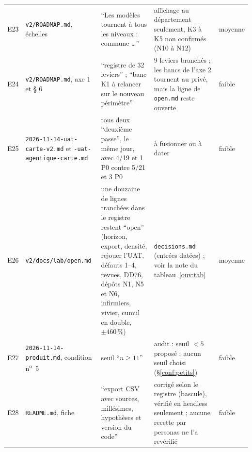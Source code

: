 \begin{small}
\begin{longtable}{@{}p{}p{}p{}p{}p{}@{}}
E23 & \texttt{v2/\allowbreak{}ROADMAP.md}, échelles & \enquote{Les modèles tournent à tous les niveaux : commune \ldots} & affichage au département seulement, K3 à K5 non confirmés (N10 à N12) & moyenne \\
E24 & \texttt{v2/\allowbreak{}ROADMAP.md}, axe 1 et § 6 & \enquote{registre de 32 leviers} ; \enquote{banc K1 à relancer sur le nouveau périmètre} & 9\mesure{} leviers branchés ; les bancs de l'axe 2 tournent au privé, mais la ligne de \texttt{open.md} reste ouverte & faible \\
E25 & \texttt{2026-\allowbreak{}11-\allowbreak{}14-\allowbreak{}uat-\allowbreak{}carte-\allowbreak{}v2.md} et \texttt{-\allowbreak{}uat-\allowbreak{}agentique-\allowbreak{}carte.md} & tous deux \enquote{deuxième passe}, le même jour, avec 4/19\mesure{} et 1 P0 contre 5/21\mesure{} et 3 P0 & à fusionner ou à dater & faible \\
E26 & \texttt{v2/\allowbreak{}docs/\allowbreak{}lab/\allowbreak{}open.md} & une douzaine\derive{} de lignes tranchées dans le registre restent \enquote{open} (horizon, export, densité, rejouer l'UAT, défauts 1--4, revues, DD76, dépôts N1, N5 et N6, infirmiers, vivier, cumul en double, $\pm460$\,\%) & \texttt{decisions.md} (entrées datées) ; voir la note du tableau~\ref{ouv:tab} & moyenne \\
E27 & \texttt{2026-\allowbreak{}11-\allowbreak{}14-\allowbreak{}produit.md}, condition n\textsuperscript{o}~5 & seuil \enquote{$n\geq11$} & audit : seuil $<5$ proposé ; aucun seuil choisi (§\ref{conf:petits}) & faible \\
E28 & \texttt{README.md}, fiche & \enquote{export CSV avec sources, millésimes, hypothèses et version du code} & corrigé selon le registre (bascule), vérifié en headless seulement ; aucune recette par personas ne l'a revérifié & faible \\
\end{longtable}
\end{small}
\endgroup
